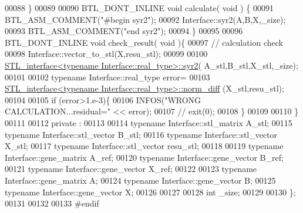 \begin{DoxyCode}
00088   \}
00089 
00090   BTL\_DONT\_INLINE \textcolor{keywordtype}{void} calculate( \textcolor{keywordtype}{void} ) \{
00091       BTL\_ASM\_COMMENT(\textcolor{stringliteral}{"#begin syr2"});
00092       Interface::syr2(A,B,X,\_size);
00093       BTL\_ASM\_COMMENT(\textcolor{stringliteral}{"end syr2"});
00094   \}
00095 
00096   BTL\_DONT\_INLINE \textcolor{keywordtype}{void} check\_result( \textcolor{keywordtype}{void} )\{
00097     \textcolor{comment}{// calculation check}
00098     Interface::vector\_to\_stl(X,resu\_stl);
00099 
00100     \hyperlink{class_s_t_l__interface}{STL\_interface<typename Interface::real\_type>::syr2}(
      A\_stl,B\_stl,X\_stl,\_size);
00101 
00102     \textcolor{keyword}{typename} Interface::real\_type error=
00103       \hyperlink{class_s_t_l__interface}{STL\_interface<typename Interface::real\_type>::norm\_diff}
      (X\_stl,resu\_stl);
00104 
00105     \textcolor{keywordflow}{if} (error>1.e-3)\{
00106       INFOS(\textcolor{stringliteral}{"WRONG CALCULATION...residual="} << error);
00107 \textcolor{comment}{//       exit(0);}
00108     \}
00109 
00110   \}
00111 
00112 private :
00113 
00114   \textcolor{keyword}{typename} Interface::stl\_matrix A\_stl;
00115   \textcolor{keyword}{typename} Interface::stl\_vector B\_stl;
00116   \textcolor{keyword}{typename} Interface::stl\_vector X\_stl;
00117   \textcolor{keyword}{typename} Interface::stl\_vector resu\_stl;
00118 
00119   \textcolor{keyword}{typename} Interface::gene\_matrix A\_ref;
00120   \textcolor{keyword}{typename} Interface::gene\_vector B\_ref;
00121   \textcolor{keyword}{typename} Interface::gene\_vector X\_ref;
00122 
00123   \textcolor{keyword}{typename} Interface::gene\_matrix A;
00124   \textcolor{keyword}{typename} Interface::gene\_vector B;
00125   \textcolor{keyword}{typename} Interface::gene\_vector X;
00126 
00127 
00128   \textcolor{keywordtype}{int} \_size;
00129 
00130 \};
00131 
00132 
00133 \textcolor{preprocessor}{#endif}
\end{DoxyCode}

